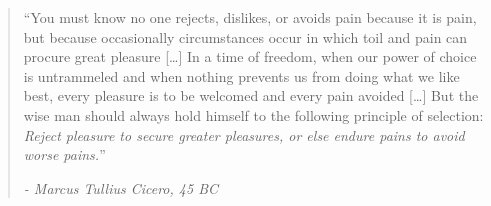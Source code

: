 \documentclass[../main.tex]{subfiles}
\begin{document}
\vspace*{\fill}
\begin{quote}
	``You must know no one rejects, dislikes, or avoids pain because it is pain, but because occasionally circumstances occur in which toil and pain can procure great pleasure
	[\ldots]
	In a time of freedom, when our power of choice is untrammeled and when nothing prevents us from doing what we like best, every pleasure is to be welcomed and every pain avoided [\ldots]
	But the wise man should always hold himself to the following principle of selection: \textit{Reject pleasure to secure greater pleasures, or else endure pains to avoid worse pains.}''
	
	\begin{flushright}
		\textit{- Marcus Tullius Cicero, 45 BC}
	\end{flushright}
\end{quote}
\vfill

\newpage %
\thispagestyle{empty}
\mbox{}

	
\end{document}
